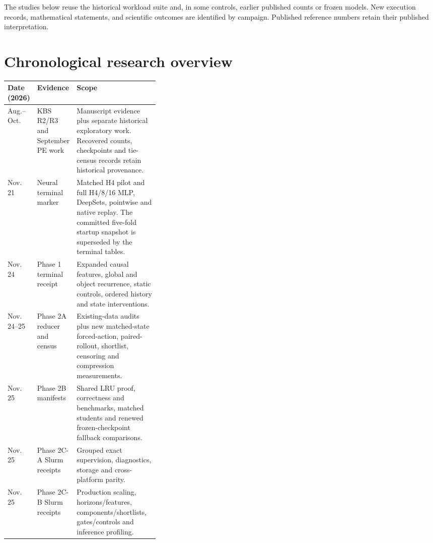 \documentclass[11pt,letterpaper]{article}
\begin{document}
The studies below reuse the historical workload suite and, in some controls, earlier published counts or frozen models. New execution records, mathematical statements, and scientific outcomes are identified by campaign. Published reference numbers retain their published interpretation.

\section{Chronological research overview}
\begin{tabularx}{\linewidth}{@{}>{\raggedright\arraybackslash}p{0.15\linewidth}>{\raggedright\arraybackslash}p{0.20\linewidth}Y@{}}
\toprule
Date (2026) & Evidence & Scope \\ \midrule
Aug.--Oct. & KBS R2/R3 and September PE work & Manuscript evidence plus separate historical exploratory work. Recovered counts, checkpoints and tie-census records retain historical provenance. \\
Nov. 21 & Neural terminal marker & Matched H4 pilot and full H4/8/16 MLP, DeepSets, pointwise and native replay. The committed five-fold startup snapshot is superseded by the terminal tables. \\
Nov. 24 & Phase 1 terminal receipt & Expanded causal features, global and object recurrence, static controls, ordered history and state interventions. \\
Nov. 24--25 & Phase 2A reducer and census & Existing-data audits plus new matched-state forced-action, paired-rollout, shortlist, censoring and compression measurements. \\
Nov. 25 & Phase 2B manifests & Shared LRU proof, correctness and benchmarks, matched students and renewed frozen-checkpoint fallback comparisons. \\
Nov. 25 & Phase 2C-A Slurm receipts & Grouped exact supervision, diagnostics, storage and cross-platform parity. \\
Nov. 25 & Phase 2C-B Slurm receipts & Production scaling, horizons/features, components/shortlists, gates/controls and inference profiling. \\
\bottomrule
\end{tabularx}
\end{document}
